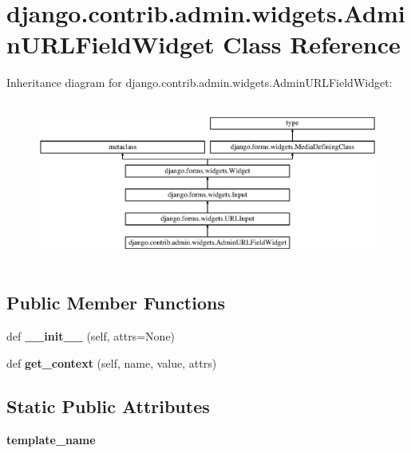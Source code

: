 \hypertarget{classdjango_1_1contrib_1_1admin_1_1widgets_1_1_admin_u_r_l_field_widget}{}\section{django.\+contrib.\+admin.\+widgets.\+Admin\+U\+R\+L\+Field\+Widget Class Reference}
\label{classdjango_1_1contrib_1_1admin_1_1widgets_1_1_admin_u_r_l_field_widget}
Inheritance diagram for django.\+contrib.\+admin.\+widgets.\+Admin\+U\+R\+L\+Field\+Widget\+:\begin{figure}[H]
\begin{center}
\leavevmode
\includegraphics[height=5.384615cm]{classdjango_1_1contrib_1_1admin_1_1widgets_1_1_admin_u_r_l_field_widget}
\end{center}
\end{figure}
\subsection*{Public Member Functions}
\begin{DoxyCompactItemize}
\item 
\mbox{\label{classdjango_1_1contrib_1_1admin_1_1widgets_1_1_admin_u_r_l_field_widget_a4bad7b5b6ddeba6b0d7817b50b990e71}} 
def {\bfseries \+\_\+\+\_\+init\+\_\+\+\_\+} (self, attrs=None)
\item 
\mbox{\label{classdjango_1_1contrib_1_1admin_1_1widgets_1_1_admin_u_r_l_field_widget_ac1797c3dff1203a82954182b471eb547}} 
def {\bfseries get\+\_\+context} (self, name, value, attrs)
\end{DoxyCompactItemize}
\subsection*{Static Public Attributes}
\begin{DoxyCompactItemize}
\item 
\mbox{\label{classdjango_1_1contrib_1_1admin_1_1widgets_1_1_admin_u_r_l_field_widget_a19ee95fddda9098575760974b728e42e}} 
{\bfseries template\+\_\+name}
\end{DoxyCompactItemize}
